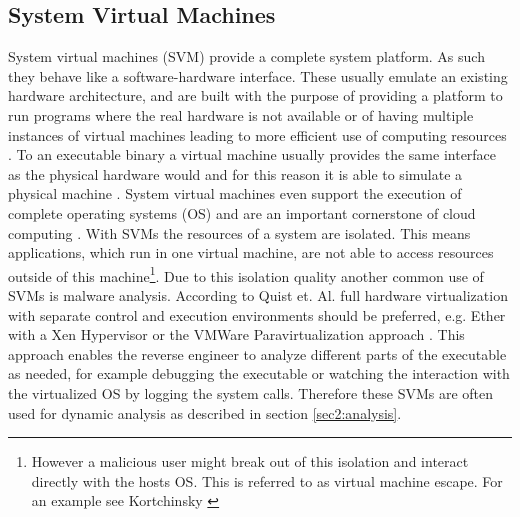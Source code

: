 \documentclass[10pt,twoside,a4paper,bibliography=totoc]{scrbook}
\begin{document}
\subsection{System Virtual Machines}
\label{sec2:sysvm}
System virtual machines (SVM) provide a complete system platform. As such they behave like a software-hardware interface.
These usually emulate an existing hardware architecture, and are built with the purpose of providing a platform to run programs where the real hardware is not available or of having multiple instances of virtual machines leading to more efficient use of computing resources \cite{craig2006virtual}.
To an executable binary a virtual machine usually provides the same interface as the physical hardware would and for this reason it is able to simulate a physical machine \cite{craig2006virtual}.
System virtual machines even support the execution of complete operating systems (OS) and are an important cornerstone of cloud computing \cite{virtmach70, craig2006virtual}.
With SVMs the resources of a system are isolated. This means applications, which run in one virtual machine, are not able to access resources outside of this machine\footnote{However a malicious user might break out of this isolation and interact directly with the hosts OS. This is referred to as virtual machine escape. For an example see Kortchinsky \cite{kortchinsky}}. 
Due to this isolation quality another common use of SVMs is malware analysis. 
According to Quist et. Al. \cite{DEFCON17:QuLi} full hardware virtualization with separate control and execution environments should be preferred, e.g. Ether with a Xen Hypervisor \cite{Dinaburg:2008:EMA:1455770.1455779} or the VMWare Paravirtualization approach \cite{vm_ware}.
This approach enables the reverse engineer to analyze different parts of the executable as needed, for example debugging the executable or watching the interaction with the virtualized OS by logging the system calls. 
Therefore these SVMs are often used for dynamic analysis as described in section \ref{sec2:analysis}.
\end{document}
